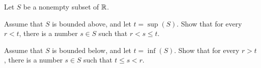 \begin{comment}

\ExerciseSolution

\ba

\item Since $\inf(S) \leq s$ for all $s \in S$, it follows that $a+\inf(S) \leq a+s$ for all $s \in S$. Therefore, $a+\inf(S)$ is a lower bound for $a+S$. 

\item Let $b$ be a lower bound for $a+S$. Suppose to the contrary that $b > a+\inf(S)$. Then $b-a > \inf(S)$. So $b-a$ cannot be a lower bound for $S$. Thus, there is an element $s \in S$ such that $b-a > s$. But then $b > a+s$, which contradicts the fact that $b$ is a lower bound for $a+S$. We conclude that $a+\inf(S)$ is a lower bound for $a+S$ from part (a) and $a+\inf(S)$ is greater than or equal to any other lower bound for $a+S$. Thus, $a+\inf(S) = \inf(a+S)$. 

\ea

\end{comment}

\item \label{ex:GLB_between} Let $S$ be a nonempty subset of $\mathbb{R}$.
\ba
\item Assume that $S$ is bounded above, and let $t = \sup(S)$. Show that for every $r < t$, there is a number $s \in S$ such that $r < s \leq t$. 

\item Assume that $S$ is bounded below, and let $t = \inf(S)$. Show that for every $r > t$, there is a number $s \in S$ such that $t \leq s < r$.

\ea

\begin{comment}

\ExerciseSolution 

\ba

\item Let $r < t$. Suppose to the contrary that no such $s$ exists. Since $t$ is an upper bound for $S$, we know that there is no element $s \in S$ with $s > t$. If there is also no element $s \in S$ with $r < s \leq t$, then it must be the case that $r \geq s$ for every $s \in S$. In other words, $r$ is an upper bound for $S$. But this contradicts the fact that $t$ is the least upper bound for $S$. We conclude that there must be an element $s \in S$ with $r < s \leq t$. 

\item Let $r > t$. Suppose to the contrary that no such $s$ exists. Since $t$ is a lower bound for $S$, we know that there is no element $s \in S$ with $s < t$. If there is also no element $s \in S$ with $t \leq s < r$, then it must be the case that $r \leq s$ for every $s \in S$. In other words, $r$ is a lower bound for $S$. But this contradicts the fact that $t$ is the greatest lower bound for $S$. We conclude that there must be an element $s \in S$ with $t \leq s < r$. 

\ea

\end{comment}

